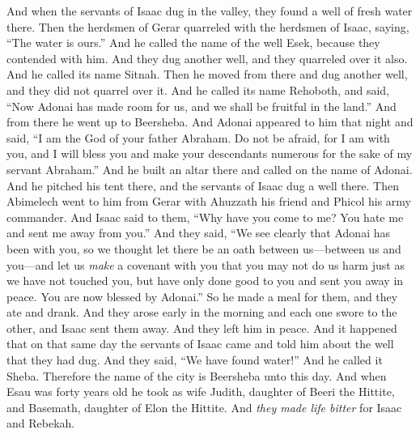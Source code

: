 \begin{biblechapter}
\verse And when the servants of Isaac dug in the valley, they found a well of fresh water there.
\verse Then the herdsmen of Gerar quarreled with the herdsmen of Isaac, saying, “The water is ours.” And he called the name of the well Esek, because they contended with him.
\verse And they dug another well, and they quarreled over it also. And he called its name Sitnah.
\verse Then he moved from there and dug another well, and they did not quarrel over it. And he called its name Rehoboth, and said, “Now Adonai has made room for us, and we shall be fruitful in the land.”
\verse And from there he went up to Beersheba.
\verse And Adonai appeared to him that night and said, “I am the God of your father Abraham. Do not be afraid, for I am with you, and I will bless you and make your descendants numerous for the sake of my servant Abraham.”
\verse And he built an altar there and called on the name of Adonai. And he pitched his tent there, and the servants of Isaac dug a well there.
\verse Then Abimelech went to him from Gerar with Ahuzzath his friend and Phicol his army commander.
\verse And Isaac said to them, “Why have you come to me? You hate me and sent me away from you.”
\verse And they said, “We see clearly that Adonai has been with you, so we thought let there be an oath between us—between us and you—and let us \textit{make} a covenant with you
\verse that you may not do us harm just as we have not touched you, but have only done good to you and sent you away in peace. You are now blessed by Adonai.”
\verse So he made a meal for them, and they ate and drank.
\verse And they arose early in the morning and each one swore to the other, and Isaac sent them away. And they left him in peace.
\verse And it happened that on that same day the servants of Isaac came and told him about the well that they had dug. And they said, “We have found water!”
\verse And he called it Sheba. Therefore the name of the city is Beersheba unto this day.
\verse And when Esau was forty years old he took as wife Judith, daughter of Beeri the Hittite, and Basemath, daughter of Elon the Hittite.
\verse And \textit{they made life bitter} for Isaac and Rebekah.
\end{biblechapter}

